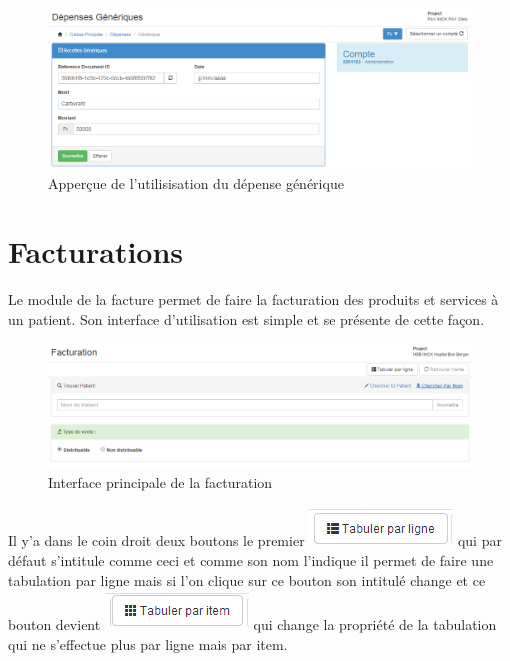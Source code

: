 \documentclass[12pt,a4paper]{report}
\begin{document}
\begin{figure}[h]
\begin{center}
\includegraphics[width=14cm]{pic/FormDepGen.png}
\end{center}
\caption{Apperçue de l'utilisisation du dépense générique}
\label{Apperçue de l'utilisisation du dépense générique}
\end{figure}



\newpage
\section{Facturations}
Le module de la facture permet de faire la facturation des produits et services à un patient. Son interface d'utilisation est simple et se présente de cette façon.

\begin{figure}[h]
\begin{center}
\includegraphics[width=14cm]{pic/InterfacePrinciFact.png}
\end{center}
\caption{Interface principale de la facturation}
\label{Interface principale de la facturation}
\end{figure}

Il y'a dans le coin droit deux boutons le premier \includegraphics[scale=0.7]{pic/tabulerParLigne.png}  qui par défaut s'intitule comme ceci et comme son nom l'indique il permet de faire une tabulation par ligne mais si l'on clique sur ce bouton son intitulé change et ce bouton devient 
\includegraphics[scale=0.7]{pic/tabulerParItem.png}  qui change la propriété de la tabulation qui ne s'effectue plus par ligne mais par item. 
\end{document}
